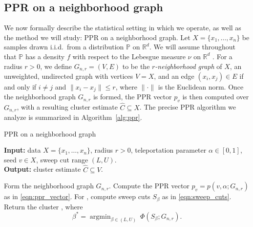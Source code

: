 \documentclass[11pt,twoside]{article}
\newcommand{\Reals}{\mathbb{R}}
\newcommand{\1}{\mathbf{1}}
\DeclareMathOperator*{\argmin}{argmin}
\newcommand{\Rd}{\Reals^d}
\newcommand{\Pbb}{\mathbb{P}}
\newcommand{\wh}[1]{\widehat{#1}}
\begin{document}
\subsection{PPR on a neighborhood graph}
\label{subsec:ppr_neighborhood_graph}
We now formally describe the statistical setting in which we operate, as well as the method we will study: PPR on a neighborhood graph. Let $X = \{x_1,\ldots, x_n\}$ be samples drawn i.i.d.\ from a distribution
$\Pbb$ on $\Rd$. We will assume throughout that $\Pbb$ has a density $f$ with respect to the Lebesgue measure $\nu$ on $\Rd$ . For a radius $r > 0$, we define
$G_{n,r}=(V,E)$ to be the \emph{$r$-neighborhood graph} of $X$, an
unweighted, undirected graph with vertices $V=X$, and an edge $(x_i,x_j) \in
E$ if and only if $i \neq j$ and $\|x_i - x_j\| \leq r$, where $\|\cdot\|$ is the
Euclidean norm. Once the neighborhood graph $G_{n,r}$ is formed, the PPR vector $p_v$ is then computed over $G_{n,r}$, with a resulting cluster estimate $\wh{C} \subseteq X$. The precise PPR algorithm we analyze is summarized in Algorithm~\ref{alg:ppr}.   

\begin{algorithm}
	\caption{PPR on a neighborhood graph}
	\label{alg:ppr}	
	{\bfseries Input:} data $X=\{x_1,\ldots,x_n\}$, radius $r > 0$, teleportation
	parameter $\alpha \in [0,1]$, seed $v \in X$, sweep cut range $(L,U)$. \\     
	{\bfseries Output:} cluster estimate $\wh{C} \subseteq V$.
	\begin{algorithmic}[1]
		\STATE Form the neighborhood graph $G_{n,r}$.
		\STATE Compute the PPR vector $p_v=p(v, \alpha; G_{n,r})$ as in
		\eqref{eqn:ppr_vector}.  
		\STATE For , compute sweep cuts $S_{\beta}$ as in
		\eqref{eqn:sweep_cuts}.\footnotemark
		\STATE Return the cluster \smash{$\wh{C} = S_{\beta^*}$}, where  
		$$
		\beta^* = \argmin_{\beta \in (L,U)}~ \Phi(S_{\beta}; G_{n,r}).
		$$
	\end{algorithmic}
\end{algorithm}
\end{document}
